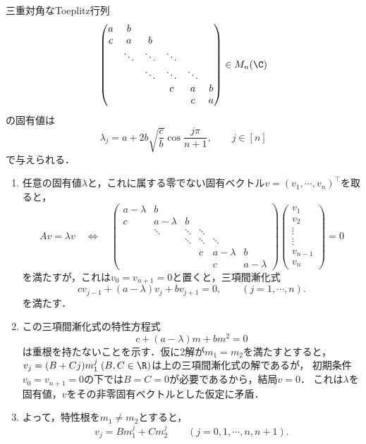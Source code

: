 \documentclass[uplatex,dvipdfmx]{jsreport}
\begin{document}
\begin{lemma}
    三重対角なToeplitz行列
    \[\begin{pmatrix}
        a&b\\
        c&a&b\\
        &\ddots&\ddots&\ddots\\
        &&\ddots&\ddots&\ddots\\
        &&&c&a&b\\
        &&&&c&a
    \end{pmatrix}\in M_n(\C)\]
    の固有値は
    \[\lambda_j=a+2b\sqrt{\frac{c}{b}}\cos\frac{j\pi}{n+1},\qquad j\in[n]\]
    で与えられる．
\end{lemma}
\begin{Proof}\mbox{}
    \begin{enumerate}[{Step}1]
        \item 任意の固有値$\lambda$と，これに属する零でない固有ベクトル$v=(v_1,\cdots,v_n)^\top$を取ると，
        \[Av=\lambda v\quad\Leftrightarrow\quad 
        \begin{pmatrix}
            a-\lambda&b\\
            c&a-\lambda&b\\
            &\ddots&\ddots&\ddots\\
            &&\ddots&\ddots&\ddots\\
            &&&c&a-\lambda&b\\
            &&&&c&a-\lambda
        \end{pmatrix}\begin{pmatrix}v_1\\v_2\\\vdots\\\vdots\\v_{n-1}\\v_n\end{pmatrix}=0\]
        を満たすが，これは$v_0=v_{n+1}=0$と置くと，三項間漸化式
        \[cv_{j-1}+(a-\lambda)v_j+bv_{j+1}=0,\qquad(j=1,\cdots,n).\]
        を満たす．
        \item この三項間漸化式の特性方程式
        \[c+(a-\lambda)m+bm^2=0\]
        は重根を持たないことを示す．仮に2解が$m_1=m_2$を満たすとすると，
        $v_j=(B+Cj)m_1^j\;(B,C\in\R)$は上の三項間漸化式の解であるが，
        初期条件$v_0=v_{n+1}=0$の下では$B=C=0$が必要であるから，結局$v=0$．
        これは$\lambda$を固有値，$v$をその非零固有ベクトルとした仮定に矛盾．
        \item よって，特性根を$m_1\ne m_2$とすると，
        \[v_j=Bm_1^j+Cm_2^j\qquad(j=0,1,\cdots,n,n+1).\]

\end{enumerate}
\end{Proof}
\end{document}
